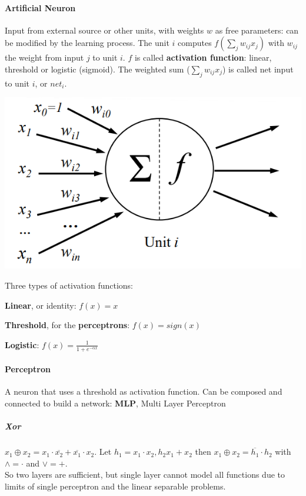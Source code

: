 \documentclass[10pt]{report}
\begin{document}
\paragraph{Artificial Neuron} Input from external source or other units, with weights $w$ as free parameters: can be modified by the learning process. The unit $i$ computes $f(\sum_j w_{ij}x_j)$ with $w_{ij}$ the weight from input $j$ to unit $i$. $f$ is called \textbf{activation function}: linear, threshold or logistic (sigmoid). The weighted sum ($\sum_j w_{ij}x_j$) is called net input to unit $i$, or $net_i$.
\begin{center}
	\includegraphics[scale=0.75]{6.png}
\end{center}
Three types of activation functions:
\begin{list}{}{}
	\item \textbf{Linear}, or identity: $f(x) = x$
	\item \textbf{Threshold}, for the \textbf{perceptrons}: $f(x) = sign(x)$
	\item \textbf{Logistic}: $f(x) = \frac{1}{1 + e^{-\alpha x}}$
\end{list}
\paragraph{Perceptron} A neuron that uses a threshold as activation function. Can be composed and connected to build a network: \textbf{MLP}, Multi Layer Perceptron 
\subparagraph{Xor} $x_1 \oplus x_2 = x_1\cdot \overline{x_2} + \overline{x_1}\cdot x_2$. Let $h_1 = x_1\cdot x_2, h_2 x_1 + x_2$ then $x_1 \oplus x_2 = \overline{h_1} \cdot h_2$ with $\wedge = \cdot$ and $\vee = +$.\\
So two layers are sufficient, but single layer cannot model all functions due to limits of single perceptron and the linear separable problems.
\end{document}
